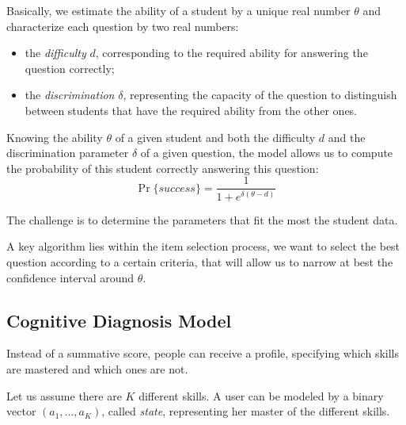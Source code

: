 \documentclass{sig-alternate}
\begin{document}

Basically, we estimate the ability of a student by a unique real number $\theta$ and characterize each question by two real numbers:

\begin{itemize}
\item the \emph{difficulty} $d$, corresponding to the required ability for answering the question correctly; %
\item the \emph{discrimination} $\delta$, representing the capacity of the question to distinguish between students that have the required ability from the other ones.
\end{itemize}

Knowing the ability $\theta$ of a given student and both the difficulty $d$ and the discrimination parameter $\delta$ of a given question, the model allows us to compute the probability of this student correctly answering this question:
\[ \Pr\{success\} = \frac1{1+e^{\delta(\theta - d)}} \]

The challenge is to determine the parameters that fit the most the student data.



A key algorithm lies within the item selection process, we want to select the best question according to a certain criteria, that will allow us to narrow at best the confidence interval around $\theta$.


\subsection{Cognitive Diagnosis Model}


Instead of a summative score, people can receive a profile, specifying which skills are mastered and which ones are not. %

Let us assume there are $K$ different skills. A user can be modeled by a binary vector $(a_1, \ldots, a_K)$, called \emph{state}, representing her master of the different skills. %

\end{document}
